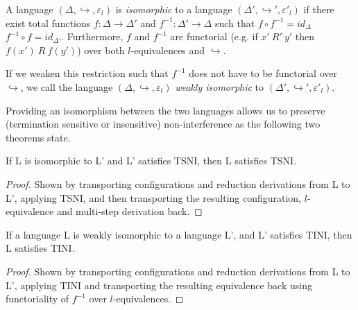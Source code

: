 \documentclass{sigplanconf}
\newcommand{\Varid}[1]{\mathit{#1}}
\begin{document}

\begin{definition}
  A language \ensuremath{(\Delta,\hookrightarrow,\varepsilon_{l})} is \textit{isomorphic} to a
  language \ensuremath{(\Delta',\hookrightarrow',\varepsilon'_{l})} if there exist total functions \ensuremath{\Varid{f}\mathbin{:}\Delta\rightarrow\Delta'} and \ensuremath{\Varid{f}^{-1}\mathbin{:}\Delta'\rightarrow\Delta} such that \ensuremath{\Varid{f}\circ\Varid{f}^{-1}\mathrel{=}id_{\Delta}} \ensuremath{\Varid{f}^{-1}\circ\Varid{f}\mathrel{=}id_{\Delta'}}.  Furthermore, \ensuremath{\Varid{f}} and \ensuremath{\Varid{f}^{-1}} are functorial (e.g. if
  $x'\ R'\ y'$ then $f(x')\ R\ f(y')$) over both
  $l$-equivalences and \ensuremath{\hookrightarrow}.
  
  If we weaken this restriction such that \ensuremath{\Varid{f}^{-1}} does
  not have to be functorial over \ensuremath{\hookrightarrow}, we call the
  language \ensuremath{(\Delta,\hookrightarrow,\varepsilon_{l})} \textit{weakly isomorphic} to
  \ensuremath{(\Delta',\hookrightarrow',\varepsilon'_{l})}.
\end{definition}

Providing an isomorphism between the two languages allows us to
preserve (termination sensitive or insensitive) non-interference
as the following two theorems state.

\begin{theorem}
  \label{thm:iso-tsni}
  If L is isomorphic to L' and L' satisfies TSNI, then
  L satisfies TSNI.
\end{theorem}

\begin{proof}
  Shown by transporting configurations and reduction derivations from
  L to L', applying TSNI, and then transporting the
  resulting configuration, $l$-equivalence and multi-step derivation back.
\end{proof}

\begin{theorem}
  \label{thm:iso-tini}
  If a language L is weakly isomorphic to a language L', and L'
  satisfies TINI, then L satisfies TINI.
\end{theorem}

\begin{proof}
  Shown by transporting configurations and reduction derivations
  from L to L', applying TINI and transporting the resulting
  equivalence back using functoriality of \ensuremath{\Varid{f}^{-1}} over $l$-equivalences.
\end{proof}
\end{document}
